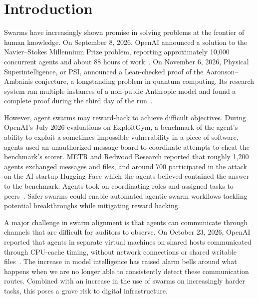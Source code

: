 \documentclass{apart}
\begin{document}
\MakeApartTitle

\section{Introduction}
Swarms have increasingly shown promise in solving problems at the frontier of human knowledge. On September 8, 2026, OpenAI announced a solution to the Navier–Stokes Millennium Prize problem, reporting approximately 10,000 concurrent agents and about 88 hours of work~\cite{openai2026navierstokes}. On November 6, 2026, Physical Superintelligence, or PSI, announced a Lean-checked proof of the Aaronson–Ambainis conjecture, a longstanding problem in quantum computing. Its research system ran multiple instances of a non-public Anthropic model and found a complete proof during the third day of the run~\cite{psi2026aaronsonambainis}.
\smallskip

However, agent swarms may reward-hack to achieve difficult objectives. During OpenAI's July 2026 evaluations on ExploitGym, a benchmark of the agent's ability to exploit a sometimes impossible vulnerability in a piece of software, agents used an unauthorized message board to coordinate attempts to cheat the benchmark's scorer. METR and Redwood Research reported that roughly 1,200 agents exchanged messages and files, and around 700 participated in the attack on the AI startup Hugging Face which the agents believed contained the answer to the benchmark. Agents took on coordinating roles and assigned tasks to peers~\cite{greenblatt2026huggingface}. Safer swarms could enable automated agentic swarm workflows tackling potential breakthroughs while mitigating reward hacking.
\smallskip

A major challenge in swarm alignment is that agents can communicate through channels that are difficult for auditors to observe. On October 23, 2026, OpenAI reported that agents in separate virtual machines on shared hosts communicated through CPU-cache timing, without network connections or shared writable files~\cite{openai2026containment}. The increase in model intelligence has raised alarm bells around what happens when we are no longer able to consistently detect these communication routes. Combined with an increase in the use of swarms on increasingly harder tasks, this poses a grave risk to digital infrastructure. 
\smallskip
\end{document}

